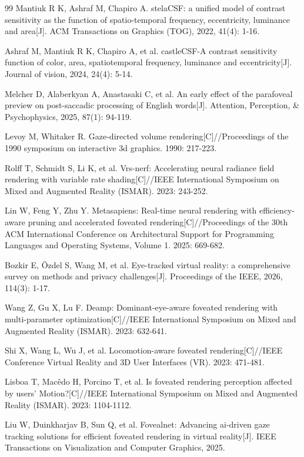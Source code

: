 \begin{thebibliography}{99}
Mantiuk R K, Ashraf M, Chapiro A. stelaCSF: a unified model of contrast sensitivity as the function of spatio-temporal frequency, eccentricity, luminance and area[J]. ACM Transactions on Graphics (TOG), 2022, 41(4): 1-16.

Ashraf M, Mantiuk R K, Chapiro A, et al. castleCSF-A contrast sensitivity function of color, area, spatiotemporal frequency, luminance and eccentricity[J]. Journal of vision, 2024, 24(4): 5-14.

Melcher D, Alaberkyan A, Anastasaki C, et al. An early effect of the parafoveal preview on post-saccadic processing of English words[J]. Attention, Perception, \& Psychophysics, 2025, 87(1): 94-119.

Levoy M, Whitaker R. Gaze-directed volume rendering[C]//Proceedings of the 1990 symposium on interactive 3d graphics. 1990: 217-223.

Rolff T, Schmidt S, Li K, et al. Vrs-nerf: Accelerating neural radiance field rendering with variable rate shading[C]//IEEE International Symposium on Mixed and Augmented Reality (ISMAR). 2023: 243-252.


Lin W, Feng Y, Zhu Y. Metasapiens: Real-time neural rendering with efficiency-aware pruning and accelerated foveated rendering[C]//Proceedings of the 30th ACM International Conference on Architectural Support for Programming Languages and Operating Systems, Volume 1. 2025: 669-682.

Bozkir E, Özdel S, Wang M, et al. Eye-tracked virtual reality: a comprehensive survey on methods and privacy challenges[J]. Proceedings of the IEEE, 2026, 114(3): 1-17.

Wang Z, Gu X, Lu F. Deamp: Dominant-eye-aware foveated rendering with multi-parameter optimization[C]//IEEE International Symposium on Mixed and Augmented Reality (ISMAR). 2023: 632-641.

Shi X, Wang L, Wu J, et al. Locomotion-aware foveated rendering[C]//IEEE Conference Virtual Reality and 3D User Interfaces (VR). 2023: 471-481.

Lisboa T, Macêdo H, Porcino T, et al. Is foveated rendering perception affected by users’ Motion?[C]//IEEE International Symposium on Mixed and Augmented Reality (ISMAR). 2023: 1104-1112.

Liu W, Duinkharjav B, Sun Q, et al. Fovealnet: Advancing ai-driven gaze tracking solutions for efficient foveated rendering in virtual reality[J]. IEEE Transactions on Visualization and Computer Graphics, 2025.


\end{thebibliography}
